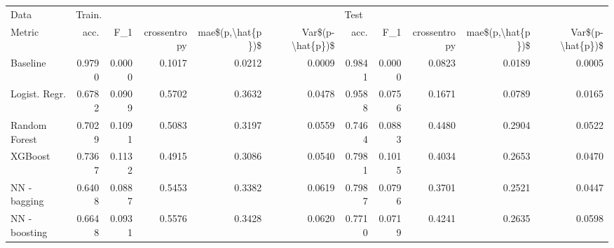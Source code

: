 \begin{tabular}{lrrrrrrrrrr}
\toprule
Data & \multicolumn{5}{l}{Train.} & \multicolumn{5}{l}{Test} \\
Metric &    acc. &     F\_1 & crossentropy & mae\$(p,\textbackslash hat\{p\})\$ & Var\$(p-\textbackslash hat\{p\})\$ &    acc. &     F\_1 & crossentropy & mae\$(p,\textbackslash hat\{p\})\$ & Var\$(p-\textbackslash hat\{p\})\$ \\
\midrule
Baseline      &  0.9790 &  0.0000 &       0.1017 &           0.0212 &           0.0009 &  0.9841 &  0.0000 &       0.0823 &           0.0189 &           0.0005 \\
Logist. Regr. &  0.6782 &  0.0909 &       0.5702 &           0.3632 &           0.0478 &  0.9588 &  0.0756 &       0.1671 &           0.0789 &           0.0165 \\
Random Forest &  0.7029 &  0.1091 &       0.5083 &           0.3197 &           0.0559 &  0.7464 &  0.0883 &       0.4480 &           0.2904 &           0.0522 \\
XGBoost       &  0.7367 &  0.1132 &       0.4915 &           0.3086 &           0.0540 &  0.7981 &  0.1015 &       0.4034 &           0.2653 &           0.0470 \\
NN - bagging  &  0.6408 &  0.0887 &       0.5453 &           0.3382 &           0.0619 &  0.7987 &  0.0796 &       0.3701 &           0.2521 &           0.0447 \\
NN - boosting &  0.6648 &  0.0931 &       0.5576 &           0.3428 &           0.0620 &  0.7710 &  0.0719 &       0.4241 &           0.2635 &           0.0598 \\
\bottomrule
\end{tabular}
